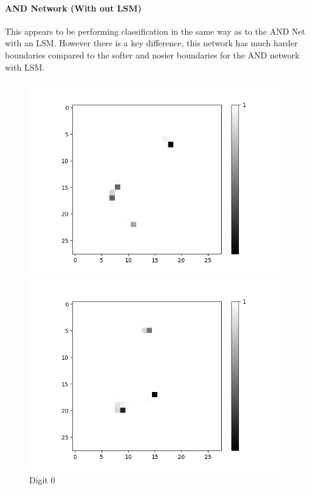\paragraph{AND Network (With out LSM)}
This appears to be performing classification in the same way as to the AND Net with an LSM. However there is a key difference, this network has much harder boundaries compared to the softer and nosier boundaries for the AND network with LSM.

\begin{figure}[H]
	\captionsetup{labelformat=empty}
	\centering
	\begin{minipage}[b]{0.19\textwidth}
		\includegraphics[width=\textwidth]{AND(NO-LSM)/Positive/Layer0-Neuron-0.png}
		\caption{Digit 0}
		\label{fig:cnf-descrete-generalizatiion}
	\end{minipage}
	\begin{minipage}[b]{0.19\textwidth}
		\includegraphics[width=\textwidth]{AND(NO-LSM)/Positive/Layer0-Neuron-2.png}

\end{minipage}
\end{figure}
